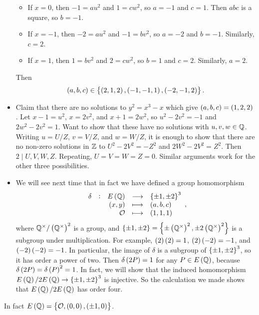 \begin{example}
\begin{itemize}
\begin{itemize}
\item If $ x = 0 $, then $ -1 = au^2 $ and $ 1 = cw^2 $, so $ a = -1 $ and $ c = 1 $. Then $ abc $ is a square, so $ b = -1 $.
\item If $ x = -1 $, then $ -2 = au^2 $ and $ -1 = bv^2 $, so $ a = -2 $ and $ b = -1 $. Similarly, $ c = 2 $.
\item If $ x = 1 $, then $ 1 = bv^2 $ and $ 2 = cw^2 $, so $ b = 1 $ and $ c = 2 $. Similarly, $ a = 2 $.
\end{itemize}
Then
$$ \br{a, b, c} \in \cbr{\br{2, 1, 2}, \br{-1, -1, 1}, \br{-2, -1, 2}}. $$
\item Claim that there are no solutions to $ y^2 = x^3 - x $ which give $ \br{a, b, c} = \br{1, 2, 2} $. Let $ x - 1 = u^2 $, $ x = 2v^2 $, and $ x + 1 = 2w^2 $, so $ u^2 - 2v^2 = -1 $ and $ 2w^2 - 2v^2 = 1 $. Want to show that these have no solutions with $ u, v, w \in \mathbb{Q} $. Writing $ u = U / Z $, $ v = V / Z $, and $ w = W / Z $, it is enough to show that there are no non-zero solutions in $ \mathbb{Z} $ to $ U^2 - 2V^2 = -Z^2 $ and $ 2W^2 - 2V^2 = Z^2 $. Then $ 2 \mid U, V, W, Z $. Repeating, $ U = V = W = Z = 0 $. Similar arguments work for the other three possibilities.
\item We will see next time that in fact we have defined a group homomorphism
$$
\begin{array}{ccrcl}
\delta & : & E\br{\QQ} & \longrightarrow & \cbr{\pm 1, \pm 2}^3 \\
& & \br{x, y} & \longmapsto & \br{a, b, c} \\
& & \OOO & \longmapsto & \br{1, 1, 1}
\end{array},
$$
where $ \QQ^\times / \br{\QQ^\times}^2 $ is a group, and $ \cbr{\pm 1, \pm 2} = \cbr{\pm\br{\QQ^\times}^2, \pm2\br{\QQ^\times}^2} $ is a subgroup under multiplication. For example, $ \br{2}\br{2} = 1 $, $ \br{2}\br{-2} = -1 $, and $ \br{-2}\br{-2} = -1 $. In particular, the image of $ \delta $ is a subgroup of $ \cbr{\pm 1, \pm 2}^3 $, so it has order a power of two. Then $ \delta\br{2P} = 1 $ for any $ P \in E\br{\QQ} $, because $ \delta\br{2P} = \delta\br{P}^2 = 1 $. In fact, we will show that the induced homomorphism $ E\br{\QQ} / 2E\br{\QQ} \to \cbr{\pm 1, \pm 2}^3 $ is injective. So the calculation we made shows that $ E\br{\QQ} / 2E\br{\QQ} $ has order four.
\end{itemize}
In fact $ E\br{\QQ} = \cbr{\OOO, \br{0, 0}, \br{\pm 1, 0}} $.
\end{example}

\pagebreak

